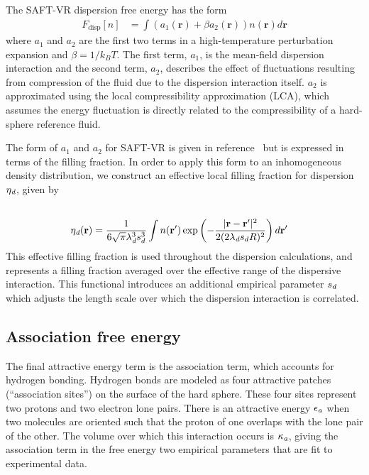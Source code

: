 \documentclass[letterpaper,twocolumn,amsmath,amssymb,prb]{revtex4-1}
\newcommand{\xx}{\textbf{r}}
\begin{document}
The SAFT-VR dispersion free energy has the form~\cite{gil-villegas-1997-SAFT-VR}
\begin{align}
  F_\text{disp}[n] &= \int \left(a_1(\xx) + \beta a_2(\xx)\right)n(\xx)d\xx
\end{align}
where $a_1$ and $a_2$ are the first two terms in a high-temperature
perturbation expansion and $\beta=1/k_BT$.  The first term, $a_1$, is 
the mean-field dispersion interaction and the second term, $a_2$, describes the
effect of fluctuations resulting from compression of the fluid due
to the dispersion interaction itself. $a_2$ is approximated
using the local compressibility approximation (LCA), which
assumes the energy fluctuation is directly related to the
compressibility of a hard-sphere reference fluid\cite{barker1976liquid}.

The form of $a_1$ and $a_2$ for SAFT-VR is given in
reference~\cite{gil-villegas-1997-SAFT-VR} but is expressed in terms
of the filling fraction.  In order to apply this form to an
inhomogeneous density distribution, we construct an effective local
filling fraction for dispersion $\eta_\textit{d}$, given by
\begin{align}
  \\
  \etadisp(\xx) &= \frac{1}{6\sqrt{\pi} \lambdadisp^3\lscale^3}
  \int n(\xx')\exp\left({-\frac{|\xx-\xx'|^2}{2(2 \lambdadisp
      \lscale R)^2}}\right)d\xx'
\end{align}
This effective filling fraction is used throughout the dispersion
calculations, and represents a filling fraction averaged over the
effective range of the dispersive interaction.  This functional
introduces an additional empirical parameter $s_d$ which adjusts
the length scale over which the dispersion interaction is correlated.

\subsection{Association free energy}
The final attractive energy term is the association term, which
accounts for hydrogen bonding.  Hydrogen bonds are modeled as four
attractive patches (``association sites'') on the surface of the hard
sphere.  These four sites represent two protons and two electron lone
pairs.  There is an attractive energy $\epsilon_\textit{a}$ when
two molecules are oriented such that the proton of one overlaps
with the lone pair of the other.  The volume over which this
interaction occurs is $\kappa_\textit{a}$, giving the association
term in the free energy two empirical parameters that are fit to
experimental data.
\end{document}
